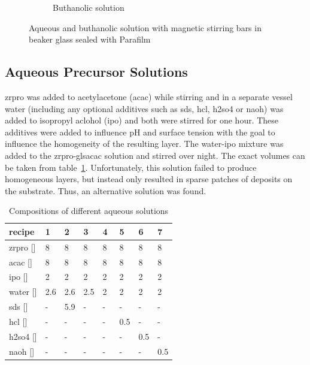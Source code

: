\begin{figure}[htb]
\begin{subfigure}{0.49\textwidth}
		\label{fig:sol-bu}
		\caption{Buthanolic solution}
	\end{subfigure}
	\label{fig:sol}
	\caption{Aqueous and buthanolic solution with magnetic stirring bars in beaker glass sealed with Parafilm} 
\end{figure}
\fi

\subsection{Aqueous Precursor Solutions}
\label{sec:exp-sol-aq}
\gls{zrpro} was added to acetylacetone (\gls{acac}) while stirring and in a separate vessel \gls{water} 
(including any optional additives such as \gls{sds}, \gls{hcl}, \gls{h2so4} or \gls{naoh}) 
was added to isopropyl aclohol (\gls{ipo}) and both were stirred for one hour. 
These additives were added to influence pH and surface tension with the goal to influence the homogeneity of the resulting layer. %
The \gls{water}-\gls{ipo} mixture was added to the \gls{zrpro}-gls{acac} solution and stirred over night. 
The exact volumes can be taken from table~\ref{tab:rec1}.
Unfortunately, this solution failed to produce homogeneous layers, but instead only resulted in sparse patches of deposits on the substrate.
Thus, an alternative solution was found.
\begin{table}[h]
	\centering
	\caption{Compositions of different aqueous solutions}
	\label{tab:rec1}
	\begin{tabular}{llllllll}
		\hline
		recipe				&1		&2		&3		&4		&5		&6		&7\\
		\hline
		\gls{zrpro} [\ml{}]	&8		&8		&8		&8		&8		&8		&8\\
		\gls{acac}  [\ml{}]	&8		&8		&8		&8		&8		&8		&8\\
		\gls{ipo}   [\ml{}]	&2		&2		&2		&2		&2		&2		&2\\
		\gls{water} [\ml{}]	&2.6	&2.6	&2.5	&2~		&2		&2		&2\\
		\gls{sds}   [\mg{}]	&-		&5.9	&-		&-		&-		&-		&-\\
		\gls{hcl}   [\ml{}]	&-		&-		&-		&-		&0.5	&-		&-\\
		\gls{h2so4} [\ml{}]	&-		&-		&-		&-		&-		&0.5	&-\\
		\gls{naoh}  [\ml{}] &-		&-		&-		&-		&-		&-		&0.5\\
		\hline
	\end{tabular}
\end{table}
%
